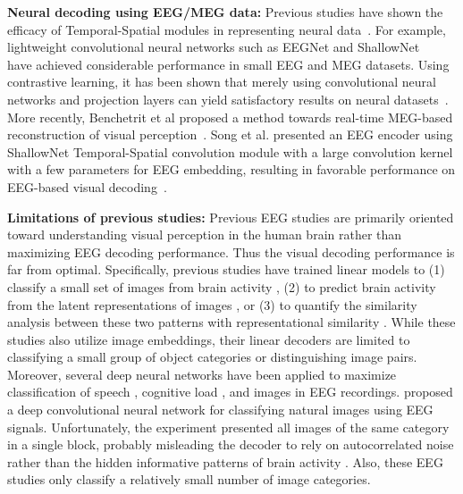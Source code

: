 \documentclass{article}
\begin{document}
\textbf{Neural decoding using EEG/MEG data:} Previous studies have shown the efficacy of Temporal-Spatial modules in representing neural data~\cite{schirrmeister2017deep,lawhern2018eegnet}. For example, lightweight convolutional neural networks such as EEGNet and ShallowNet ~\cite{schirrmeister2017deep} have achieved considerable performance in small EEG and MEG datasets. %
Using contrastive learning, it has been shown that merely using convolutional neural networks and projection layers can yield satisfactory results on neural datasets~\cite{chen2020simple}.  More recently, Benchetrit et al proposed a method towards real-time MEG-based reconstruction of visual perception~\cite{Benchetrit_2023}. Song et al. presented an EEG encoder using ShallowNet Temporal-Spatial convolution module with a large convolution kernel with a few parameters for EEG embedding, resulting in favorable performance on EEG-based visual decoding~\cite{song2023decoding}.

\textbf{Limitations of previous studies:} Previous EEG studies are primarily oriented toward understanding visual perception in the human brain rather than maximizing EEG decoding performance. Thus the visual decoding performance is far from optimal. Specifically, previous studies have trained linear models to (1) classify a small set of images from brain activity \cite{grootswagers2019representational,king2021human}, (2) to predict brain activity from the latent representations of images \cite{cichy2017multivariate}, or (3) to quantify the similarity analysis between these two patterns with representational similarity \cite{cichy2017multivariate,grootswagers2019representational,gifford2022large,bankson2018temporal}. While these studies also utilize image embeddings, their linear decoders are limited to classifying a small group of object categories or distinguishing image pairs. Moreover, several deep neural networks have been applied to maximize classification of speech \cite{defossez2023decoding}, cognitive load \cite{jiao2018deep}, and images \cite{palazzo2020decoding,mccartney2022zero,bagchi2022eeg} in EEG recordings. \cite{palazzo2020decoding} proposed a deep convolutional neural network for classifying natural images using EEG signals. Unfortunately, the experiment presented all images of the same category in a single block, probably misleading the decoder to rely on autocorrelated noise rather than the hidden informative patterns of brain activity  \cite{li2020perils}. Also, these EEG studies only classify a relatively small number of image categories.
\end{document}
